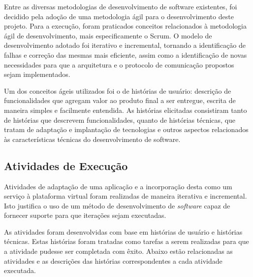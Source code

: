 Entre as diversas metodologias de desenvolvimento de software existentes, foi decidido pela adoção de uma metodologia ágil para o desenvolvimento deste projeto. Para a execução, foram praticados conceitos relacionados à metodologia ágil de desenvolvimento, mais especificamente o Scrum. O modelo de desenvolvimento adotado foi iterativo e incremental, tornando a identificação de falhas e correção das mesmas mais eficiente, assim como a identificação de novas necessidades para que a arquitetura e o protocolo de comunicação propostos sejam implementados.

Um dos conceitos ágeis utilizados foi o de histórias de usuário: descrição de funcionalidades que agregam valor ao produto final a ser entregue, escrita de maneira simples e facilmente entendida. As histórias elicitadas consistiram tanto de histórias que descrevem funcionalidades, quanto de histórias técnicas, que tratam de adaptação e implantação de tecnologias e outros aspectos relacionados às características técnicas do desenvolvimento de software.

\subsection{Atividades de Execução}
Atividades de adaptação de uma aplicação e a incorporação desta como um serviço à plataforma virtual foram realizadas de maneira iterativa e incremental. Isto justifica o uso de um método de desenvolvimento de \textit{software} capaz de fornecer suporte para que iterações sejam executadas.

As atividades foram desenvolvidas com base em histórias de usuário e histórias técnicas. Estas histórias foram tratadas como tarefas a serem realizadas para que a atividade pudesse ser completada com êxito. Abaixo estão relacionadas as atividades e as descrições das histórias correspondentes a cada atividade executada.

